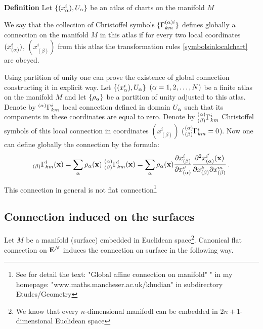 \documentclass[12pt]{article}
\theoremstyle{theorem}
\numberwithin{equation}{section}
\begin{document}
{  {\bf Definition}  Let $\{(x^i_\alpha), U_\alpha\}$ be an atlas of charts on the manifold $M$

  We say that the collection of Christoffel symbols  $\{\Gamma^{(\alpha)i}_{km}\}$
  defines globally a connection on the manifold $M$ in this atlas if for every two local coordinates
    $(x^i_{(\alpha)})$, $(x^i_{(\beta)})$ from this atlas the transformation rules  \eqref{symbolsinlocalchart}
    are obeyed.



  \m

  Using partition of unity one can prove the existence of global connection constructing it in explicit way.
  Let $\{(x^i_\alpha), U_\alpha\}$ $(\alpha=1,2,\dots,N)$ be a finite  atlas on the manifold $M$
  and let $\{\rho_\alpha\}$ be a partition of unity adjusted to this atlas.
    Denote by  $^{(\alpha)}\Gamma^i_{km}$ local connection defined in domain $U_\alpha$
    such that its components in these coordinates are equal to zero.
  Denote by $_{(\beta)}^{(\alpha)}\Gamma^i_{km}$ Christoffel symbols of this local connection
  in coordinates $(x^i_{(\beta)})$ ($_{(\beta)}^{(\alpha)}\Gamma^i_{km}=0$).
  Now one can define globally the connection by the formula:
                      \begin{equation}\label{formulaforglobalconnection}
                      {}_{(\beta)}\Gamma^i_{km}({\bf x})=
                                   \sum_\alpha \rho_\alpha({\bf x})\,\,{}^{(\alpha)}_{(\beta)}\Gamma^{i}_{km}({\bf x})=
           \sum_\alpha \rho_\alpha({\bf x}) {\partial x^{i}_{(\beta)}\over \partial x^{i'}_{(\alpha)}}
              {\partial^2 x^{i'}_{(\alpha)}({\bf x})\over \partial x^{k}_{(\beta)}\partial x^{m}_{(\beta)}}\,.
                      \end{equation}

 This connection in general is not flat connection\footnote{
 See for detail the text: "Global affine connection on manifold"
 " in my homepage: "www.maths.mancheser.ac.uk/khudian" in subdirectory Etudes/Geometry}

}


\subsection {Connection induced on the surfaces}

   Let $M$ be a manifold (surface) embedded in Euclidean space\footnote{We know that every $n$-dimensional manifodl can be embedded
    in $2n+1$-dimensional Euclidean space}.
    Canonical flat connection on ${\bf E}^N$  induces the connection on surface in the following way.
\end{document}
